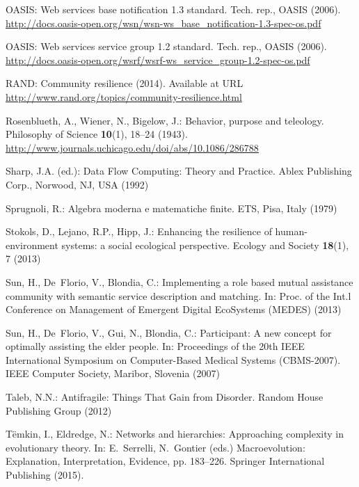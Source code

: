 \documentclass[twocolumn]{svjour3}
\begin{document}
\begin{thebibliography}{10}
OASIS: Web services base notification 1.3 standard.
\newblock Tech. rep., OASIS (2006).
\newblock
  \urlprefix\url{http://docs.oasis-open.org/wsn/wsn-ws_base_notification-1.3-spec-os.pdf}

OASIS: Web services service group 1.2 standard.
\newblock Tech. rep., OASIS (2006).
\newblock
  \urlprefix\url{http://docs.oasis-open.org/wsrf/wsrf-ws_service_group-1.2-spec-os.pdf}

{RAND}: Community resilience (2014).
\newblock Available at URL
  \url{http://www.rand.org/topics/community-resilience.html}

Rosenblueth, A., Wiener, N., Bigelow, J.: Behavior, purpose and teleology.
\newblock Philosophy of Science \textbf{10}(1), 18--24 (1943).
\newblock
  \urlprefix\url{http://www.journals.uchicago.edu/doi/abs/10.1086/286788}

Sharp, J.A. (ed.): Data Flow Computing: Theory and Practice.
\newblock Ablex Publishing Corp., Norwood, NJ, USA (1992)

Sprugnoli, R.: Algebra moderna e matematiche finite.
\newblock ETS, Pisa, Italy (1979)

Stokols, D., Lejano, R.P., Hipp, J.: Enhancing the resilience of
  human-environment systems: a social ecological perspective.
\newblock Ecology and Society \textbf{18}(1), 7 (2013)

Sun, H., {De~Florio}, V., Blondia, C.: Implementing a role based mutual
  assistance community with semantic service description and matching.
\newblock In: Proc. of the Int.l Conference on Management of Emergent Digital
  EcoSystems (MEDES) (2013)

Sun, H., De~Florio, V., Gui, N., Blondia, C.: Participant: A new concept for
  optimally assisting the elder people.
\newblock In: Proceedings of the 20th IEEE International Symposium on
  Computer-Based Medical Systems (CBMS-2007). IEEE Computer Society, Maribor,
  Slovenia (2007)

Taleb, N.N.: Antifragile: Things That Gain from Disorder.
\newblock Random House Publishing Group (2012)

T{\"e}mkin, I., Eldredge, N.: Networks and hierarchies: Approaching complexity
  in evolutionary theory.
\newblock In: E.~Serrelli, N.~Gontier (eds.) Macroevolution: Explanation,
  Interpretation, Evidence, pp. 183--226. Springer International Publishing
  (2015).
\newblock {}


\end{thebibliography}
\end{document}
